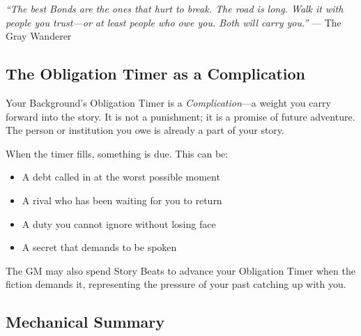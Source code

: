 \textit{``The best Bonds are the ones that hurt to break. The road is long. Walk it with people you trust---or at least people who owe you. Both will carry you.''} --- The Gray Wanderer

\subsection{The Obligation Timer as a Complication}

Your Background's Obligation Timer is a \emph{Complication}---a weight you carry forward into the story. It is not a punishment; it is a promise of future adventure. The person or institution you owe is already a part of your story.

When the timer fills, something is due. This can be:
\begin{itemize}
\item A debt called in at the worst possible moment
\item A rival who has been waiting for you to return
\item A duty you cannot ignore without losing face
\item A secret that demands to be spoken
\end{itemize}

The GM may also spend Story Beats to advance your Obligation Timer when the fiction demands it, representing the pressure of your past catching up with you.

\subsection{Mechanical Summary}

